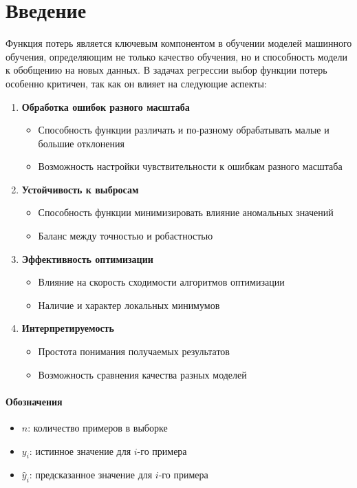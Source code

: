 \documentclass[12pt]{article}
\theoremstyle{definition}
\theoremstyle{definition}
\theoremstyle{definition}
\theoremstyle{remark}
\theoremstyle{remark}
\begin{document}
\section{Введение}

Функция потерь является ключевым компонентом в обучении моделей машинного обучения, определяющим не только качество обучения, но и способность модели к обобщению на новых данных. В задачах регрессии выбор функции потерь особенно критичен, так как он влияет на следующие аспекты:

\begin{enumerate}
    \item \textbf{Обработка ошибок разного масштаба}
    \begin{itemize}
        \item Способность функции различать и по-разному обрабатывать малые и большие отклонения
        \item Возможность настройки чувствительности к ошибкам разного масштаба
    \end{itemize}

    \item \textbf{Устойчивость к выбросам}
    \begin{itemize}
        \item Способность функции минимизировать влияние аномальных значений
        \item Баланс между точностью и робастностью
    \end{itemize}

    \item \textbf{Эффективность оптимизации}
    \begin{itemize}
        \item Влияние на скорость сходимости алгоритмов оптимизации
        \item Наличие и характер локальных минимумов
    \end{itemize}

    \item \textbf{Интерпретируемость}
    \begin{itemize}
        \item Простота понимания получаемых результатов
        \item Возможность сравнения качества разных моделей
    \end{itemize}
\end{enumerate}


\paragraph{Обозначения}
\begin{itemize}
    \item $n$: количество примеров в выборке
    \item $y_i$: истинное значение для $i$-го примера
    \item $\hat{y}_i$: предсказанное значение для $i$-го примера
\end{itemize}
\end{document}
